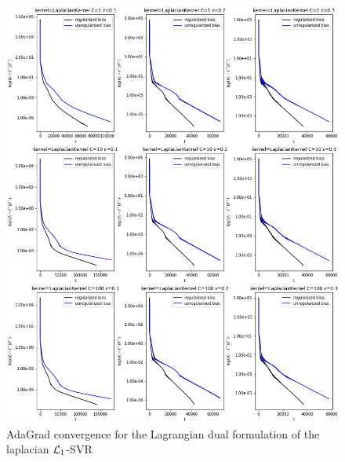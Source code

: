 



\begin{figure}[H]
	\centering
	\includegraphics[scale=0.55]{img/laplacian_lagrangian_dual_l1_svr_loss_history}
	\caption{AdaGrad convergence for the Lagrangian dual formulation of the laplacian $\protect \mathcal{L}_1$-SVR}
	\label{fig:laplacian_lagrangian_dual_l1_svr_loss_history}
\end{figure}


